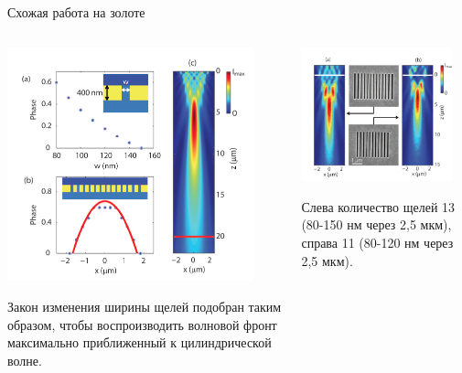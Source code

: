 \documentclass[9pt, compress, xcolor=table]{beamer}
\begin{document}
\begin{frame}{Схожая работа на золоте}
\begin{columns}[c]
\column{6.5cm}
\begin{center}
\includegraphics[width=0.9\textwidth]{ns7}

Закон изменения ширины щелей подобран таким образом, чтобы воспроизводить волновой фронт максимально приближенный к цилиндрической волне.

\end{center}
\column{6.5cm}
\begin{center}
\includegraphics[width=0.9\textwidth]{ns8}

Слева количество щелей 13 (80-150 нм через 2,5 мкм), справа 11 (80-120 нм через 2,5 мкм).

\end{center}
\end{columns}
\end{frame}
\end{document}
